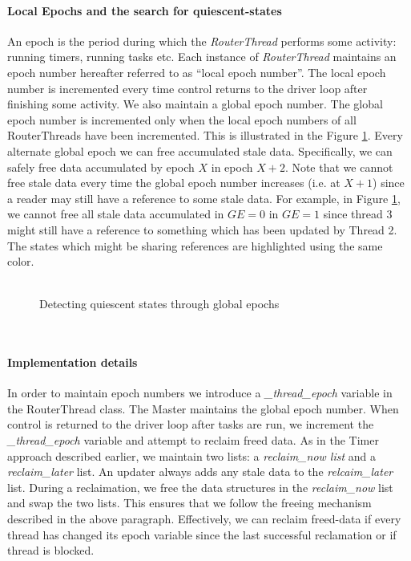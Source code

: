 \documentclass{article}
\begin{document}
\paragraph{Local Epochs and the search for quiescent-states}
An epoch is the period during which the \emph{RouterThread} performs some activity: running timers, running tasks etc. Each instance of \emph{RouterThread} maintains an epoch number hereafter referred to as ``local epoch number''. The local epoch number is incremented every time control returns to the driver loop after finishing some activity. We also maintain a global epoch number. The global epoch number is incremented only when the local epoch numbers of all RouterThreads have been incremented. This is illustrated in the Figure \ref{rcufigure}. Every alternate global epoch we can free accumulated stale data. Specifically, we can safely free data accumulated by epoch $X$ in epoch $X+2$. Note that we cannot free stale data every time the global epoch number increases (i.e. at $X+1$) since a reader may still have a reference to some stale data. For example, in Figure \ref{rcufigure}, we cannot free all stale data accumulated in $GE=0$ in $GE=1$ since thread 3 might still have a reference to something which has been updated by Thread 2. The states which might be sharing references are highlighted using the same color.
\\
\\
\begin{figure}[tph]
\label{rcufigure}
\caption{Detecting quiescent states through global epochs}
\end{figure}
\\
\paragraph{Implementation details}
In order to maintain epoch numbers we introduce a \emph{\_thread\_epoch} variable in the RouterThread class. The Master maintains the global epoch number. When control is returned to the driver loop after tasks are run, we increment the \emph{\_thread\_epoch} variable and attempt to reclaim freed data. As in the Timer approach described earlier, we maintain two lists: a \emph{reclaim\_now list} and a \emph{reclaim\_later} list. An updater always adds any stale data to the \emph{relcaim\_later} list. During a reclaimation, we free the data structures in the \emph{reclaim\_now} list and swap the two lists. This ensures that we follow the freeing mechanism described in the above paragraph. Effectively, we can reclaim freed-data if every thread has changed its epoch variable since the last successful reclamation or if thread is blocked.
\end{document}

